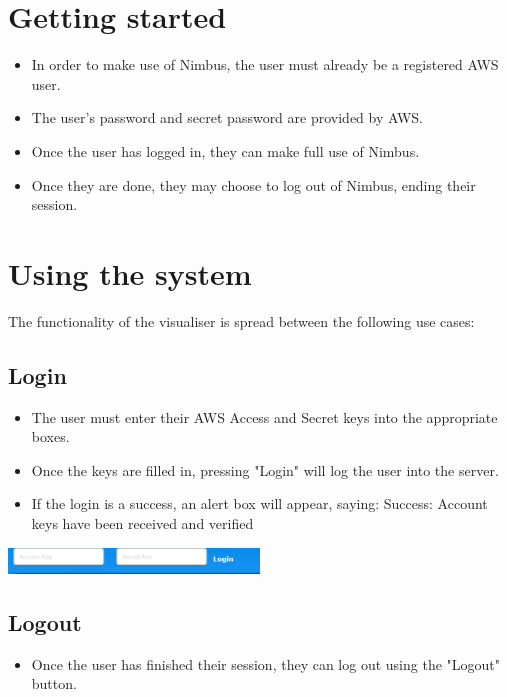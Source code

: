 \documentclass[hidelinks,a4paper,12pt]{article}
\begin{document}
\newpage

\section{Getting started}
	\begin {itemize}
		\item In order to make use of Nimbus, the user must already be a registered AWS user.
		\item The user's password and secret password are provided by AWS.
		\item Once the user has logged in, they can make full use of Nimbus.
		\item Once they are done, they may choose to log out of Nimbus, ending their session.
	\end{itemize}

\newpage

\section{Using the system}
The functionality of the visualiser is spread between the following use cases:

	\subsection{Login}
		\begin {itemize}
			\item The user must enter their AWS Access and Secret keys into the appropriate boxes.
			\item Once the keys are filled in, pressing "Login" will log the user into the server.
			\item If the login is a success, an alert box will appear, saying: Success: Account keys have been received and verified
		\end{itemize}
	
		\begin{center}
			\includegraphics[width=0.5\textwidth]{./images/LoginOne.png}
		\end{center}
		

	\subsection{Logout}
		\begin {itemize}
			\item Once the user has finished their session, they can log out using the "Logout" button.
		\end{itemize}
	
\end{document}
